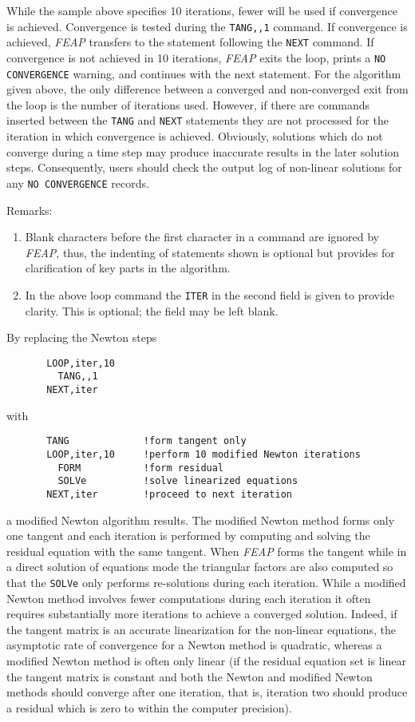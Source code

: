 While the sample above specifies 10 iterations, fewer will be used if
convergence is achieved.  Convergence is tested during the {\tt TANG,,1}
command.  If convergence is achieved, {\sl FEAP} transfers to the
statement following the {\tt NEXT} command.
If convergence is not achieved in 10 iterations, {\sl FEAP}
exits the loop, prints a {\tt NO CONVERGENCE} warning,
and continues with the next statement.
For the algorithm given above, the only difference between a converged
and non-converged exit from the loop is the number of iterations
used.  However, if there are commands inserted between the {\tt TANG} and
{\tt NEXT} statements they are not processed for the iteration in which
convergence is achieved.
Obviously, solutions which do not converge during a time step may produce
inaccurate results in the later solution steps.
Consequently, users should check the output log of non-linear solutions
for any {\tt NO CONVERGENCE} records.

Remarks:
\begin{enumerate}
\item
Blank characters before the first character in a command are ignored
by {\sl FEAP}, thus,
the indenting of statements shown is optional but provides for clarification
of key parts in the algorithm.

\item
In the above loop command the {\tt ITER} in the
second field is given to provide clarity.  This is
optional; the field may be left blank.
\end{enumerate}

By replacing the Newton steps
\begin{verbatim}
       LOOP,iter,10
         TANG,,1
       NEXT,iter
\end{verbatim}
with
\begin{verbatim}
       TANG             !form tangent only
       LOOP,iter,10     !perform 10 modified Newton iterations
         FORM           !form residual
         SOLVe          !solve linearized equations
       NEXT,iter        !proceed to next iteration
\end{verbatim}
a modified Newton algorithm results.  The modified Newton method
forms only one tangent
and each iteration is performed by computing and solving the residual equation
with the same tangent.  When {\sl FEAP} forms the tangent while in a
direct solution
of equations mode the triangular factors are also computed
so that the {\tt SOLVe} only performs re-solutions during
each iteration.  While a modified Newton method involves fewer computations
during each iteration it often
requires substantially more iterations to achieve a
converged solution.  Indeed, if the tangent matrix is an accurate linearization
for the non-linear equations, the asymptotic rate of convergence for a
Newton method is quadratic, whereas a modified Newton method is often
only linear (if the residual equation set
is linear the tangent matrix is constant
and both the Newton and modified Newton methods should converge after one
iteration, that is, iteration two should produce a residual which is
zero to within the computer precision).


